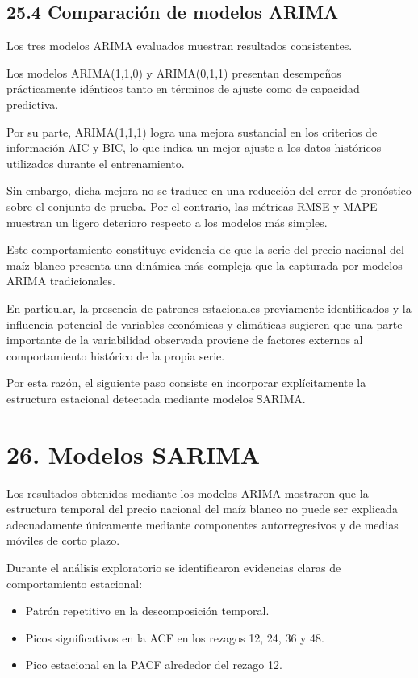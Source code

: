 \documentclass[11pt]{article}
\providecommand{\tightlist}{%
      \setlength{\itemsep}{0pt}\setlength{\parskip}{0pt}}
\begin{document}
    \hypertarget{comparaciuxf3n-de-modelos-arima}{%
\subsection{25.4 Comparación de modelos
ARIMA}\label{comparaciuxf3n-de-modelos-arima}}

Los tres modelos ARIMA evaluados muestran resultados consistentes.

Los modelos ARIMA(1,1,0) y ARIMA(0,1,1) presentan desempeños
prácticamente idénticos tanto en términos de ajuste como de capacidad
predictiva.

Por su parte, ARIMA(1,1,1) logra una mejora sustancial en los criterios
de información AIC y BIC, lo que indica un mejor ajuste a los datos
históricos utilizados durante el entrenamiento.

Sin embargo, dicha mejora no se traduce en una reducción del error de
pronóstico sobre el conjunto de prueba. Por el contrario, las métricas
RMSE y MAPE muestran un ligero deterioro respecto a los modelos más
simples.

Este comportamiento constituye evidencia de que la serie del precio
nacional del maíz blanco presenta una dinámica más compleja que la
capturada por modelos ARIMA tradicionales.

En particular, la presencia de patrones estacionales previamente
identificados y la influencia potencial de variables económicas y
climáticas sugieren que una parte importante de la variabilidad
observada proviene de factores externos al comportamiento histórico de
la propia serie.

Por esta razón, el siguiente paso consiste en incorporar explícitamente
la estructura estacional detectada mediante modelos SARIMA.

    \hypertarget{modelos-sarima}{%
\section{26. Modelos SARIMA}\label{modelos-sarima}}

Los resultados obtenidos mediante los modelos ARIMA mostraron que la
estructura temporal del precio nacional del maíz blanco no puede ser
explicada adecuadamente únicamente mediante componentes autorregresivos
y de medias móviles de corto plazo.

Durante el análisis exploratorio se identificaron evidencias claras de
comportamiento estacional:

\begin{itemize}
\tightlist
\item
  Patrón repetitivo en la descomposición temporal.
\item
  Picos significativos en la ACF en los rezagos 12, 24, 36 y 48.
\item
  Pico estacional en la PACF alrededor del rezago 12.
\end{itemize}
\end{document}
